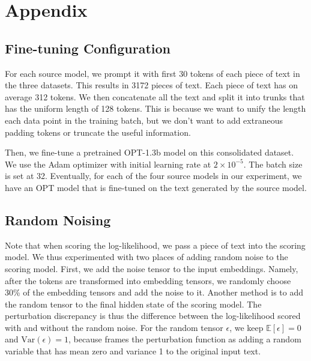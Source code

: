 \documentclass[11pt]{article}
\begin{document}
\newpage
\appendix

\section{Appendix}
\subsection{Fine-tuning Configuration} \label{A.1}
For each source model, we prompt it with first 30 tokens of each piece of text in the three datasets. This results in 3172 pieces of text. Each piece of text has on average 312 tokens. We then concatenate all the text and split it into trunks that has the uniform length of 128 tokens. This is because we want to unify the length each data point in the training batch, but we don't want to add extraneous padding tokens or truncate the useful information.

Then, we fine-tune a pretrained OPT-1.3b model on this consolidated dataset. We use the Adam optimizer with initial learning rate at $2\times10^{-5}$. The batch size is set at 32. Eventually, for each of the four source models in our experiment, we have an OPT model that is fine-tuned on the text generated by the source model.

\subsection{Random Noising} \label{A.2}
Note that when scoring the log-likelihood, we pass a piece of text into the scoring model. We thus experimented with two places of adding random noise to the scoring model. First, we add the noise tensor to the input embeddings. Namely, after the tokens are transformed into embedding tensors, we randomly choose 30\% of the embedding tensors and add the noise to it. Another method is to add the random tensor to the final hidden state of the scoring model. The perturbation discrepancy is thus the difference between the log-likelihood scored with and without the random noise. For the random tensor $\epsilon$, we keep $\mathbb{E}[\epsilon] = 0$ and $\text{Var}(\epsilon) = 1$, because \citet{detectgpt} frames the perturbation function as adding a random variable that has mean zero and variance 1 to the original input text. 
\end{document}
